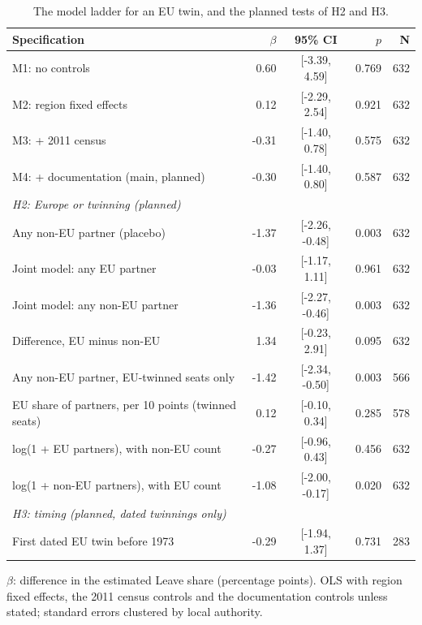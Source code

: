 \documentclass[11pt,a4paper]{article}
\begin{document}
\begin{table}[H]\centering\footnotesize\begin{threeparttable}\caption{The model ladder for an EU twin, and the planned tests of H2 and H3.}\label{tab:ladder}\begin{tabular}{p{8.2cm}rcrr}\toprule Specification & $\beta$ & 95\% CI & $p$ & N\\\midrule
M1: no controls & 0.60 & [-3.39, 4.59] & 0.769 & 632\\
M2: region fixed effects & 0.12 & [-2.29, 2.54] & 0.921 & 632\\
M3: + 2011 census & -0.31 & [-1.40, 0.78] & 0.575 & 632\\
M4: + documentation (main, planned) & -0.30 & [-1.40, 0.80] & 0.587 & 632\\
\midrule\multicolumn{5}{l}{\textit{H2: Europe or twinning (planned)}}\\
Any non-EU partner (placebo) & -1.37 & [-2.26, -0.48] & 0.003 & 632\\
Joint model: any EU partner & -0.03 & [-1.17, 1.11] & 0.961 & 632\\
Joint model: any non-EU partner & -1.36 & [-2.27, -0.46] & 0.003 & 632\\
Difference, EU minus non-EU & 1.34 & [-0.23, 2.91] & 0.095 & 632\\
Any non-EU partner, EU-twinned seats only & -1.42 & [-2.34, -0.50] & 0.003 & 566\\
EU share of partners, per 10 points (twinned seats) & 0.12 & [-0.10, 0.34] & 0.285 & 578\\
log(1 + EU partners), with non-EU count & -0.27 & [-0.96, 0.43] & 0.456 & 632\\
log(1 + non-EU partners), with EU count & -1.08 & [-2.00, -0.17] & 0.020 & 632\\
\midrule\multicolumn{5}{l}{\textit{H3: timing (planned, dated twinnings only)}}\\
First dated EU twin before 1973 & -0.29 & [-1.94, 1.37] & 0.731 & 283\\
\bottomrule\end{tabular}\begin{tablenotes}\footnotesize\item $\beta$: difference in the estimated Leave share (percentage points). OLS with region fixed effects, the 2011 census controls and the documentation controls unless stated; standard errors clustered by local authority.\end{tablenotes}\end{threeparttable}\end{table}
\end{document}
